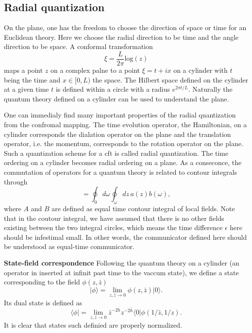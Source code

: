 \documentclass[submission, PhysLectNotes]{SciPost}
\begin{document}
\subsection{Radial quantization}
On the plane, one has the freedom to choose the direction of space or time for an Euclidean theory. Here we choose the radial direction to be time and the angle direction to be space. A conformal transformation
\begin{equation}
	\xi = \frac{L}{2\pi}\mathrm{log}\left(z\right)
\end{equation}
maps a point $z$ on a complex palne to a point $\xi=t+ix$ on a cylinder with $t$ being the time and $x\in[0,L)$ the space. The Hilbert space defined on the cylinder at a given time $t$ is defined within a circle with a radius $e^{2\pi t/L}$. Naturally the quantum theory defined on a cylinder can be used to understand the plane.

One can immedialy find many important properties of the radial quantization from the confromal mapping. The time evolution operator, the Hamiltonian, on a cylinder corresponds the dialation operator on the plane and the translation operator, i.e.  the momentum, corresponds to the rotation operator on the plane. Such a quantization scheme for a cft is called radial quantization. The time ordering on a cylinder becomes radial ordering on a plane. As  a conseconce, the commutation of operators for a quantum theory is related to contour integrals through
\begin{equation}
	[A,B] = \oint_0 d\omega \oint_\omega dz \, a(z)b(\omega),
\end{equation}
where $A$ and $B$ are defined as equal time contour integral of local fields. Note that in the coutour integral, we have assumed that there is no other fields existing between the two integral circles, which means the time difference $\epsilon$ here should be infestimal small. In other words, the communicator defined here should be understood as equal-time communicator.

{\bf State-field correspondence} Following the quantum theory on a cylinder (an operator in inserted at infinit past time to the vaccum state), we define a state corresponding to the field $\phi(z,\bar{z})$
\begin{equation}
	\vert \phi \rangle = \lim_{z,\bar{z}\to 0}\phi(z,\bar{z})\vert0\rangle.
\end{equation}
Its dual state is defined as
\begin{equation}
	\langle \phi \vert = \lim_{z,\bar{z}\to 0} \bar{z}^{-2h}z^{-2\bar{h}} \langle 0 \vert \phi(1/\bar{z},1/z).
\end{equation}
It is clear that states such definied are properly normalized.
\end{document}
